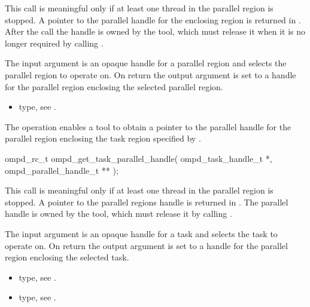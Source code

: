 \descr
This call is meaningful only if at least one thread in the parallel region is stopped.
A pointer to the parallel handle for the enclosing region is returned in 
. After the call the handle is owned by the tool, which must 
release it when it is no longer required by calling .

\argdesc
The input argument  is an opaque handle for a parallel region and selects the parallel region to operate on.
On return the output argument  is set to a handle for the parallel region
enclosing the selected parallel region.

\crossreferences
\begin{itemize}
	\item {} type, see .
\end{itemize}

\label{subsubsubsec:ompd_get_task_parallel_handle}
\summary
The    operation enables a tool to obtain a 
pointer to the parallel handle for the parallel region enclosing the task region specified by 
.

\format

\begin{cspecific}
\begin{ompSyntax}
ompd_rc_t ompd_get_task_parallel_handle(
  ompd_task_handle_t *,
  ompd_parallel_handle_t **
);
\end{ompSyntax}
\end{cspecific}


\descr
This call is meaningful only if at least one thread in the parallel region is stopped.
A pointer to the parallel regions handle is returned in .
The parallel handle is owned by the 
tool, which must release it by calling .

\argdesc
The input argument  is an opaque handle for a task and selects the task to operate on.
On return the output argument  is set to a handle for the parallel region
enclosing the selected task.

\crossreferences
\begin{itemize}
	\item {} type, see .
	\item {} type, see .
\end{itemize}

